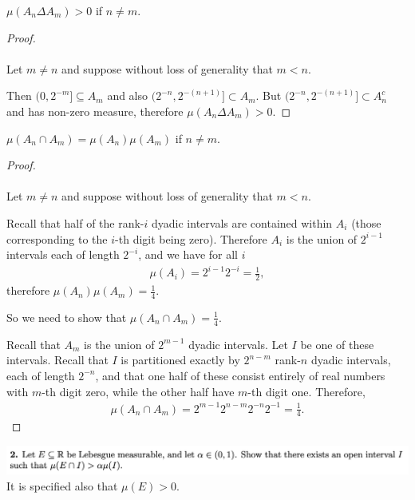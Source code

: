 \begin{claim*}
  $\mu(A_n \Delta A_m) > 0$ if $n \neq m$.
\end{claim*}

\begin{proof}~\\~\\
  Let $m \neq n$ and suppose without loss of generality that $m < n$.

  Then $(0, 2^{-m}] \subseteq A_m$ and also $(2^{-n}, 2^{-(n+1)}] \subset A_m$.
  But $(2^{-n}, 2^{-(n+1)}] \subset A_n^c$ and has non-zero measure, therefore $\mu(A_n \Delta A_m) > 0$.
\end{proof}

\begin{claim*}
  $\mu(A_n \cap A_m) = \mu(A_n)\mu(A_m)$ if $n \neq m$.
\end{claim*}

\begin{proof}~\\~\\
  Let $m \neq n$ and suppose without loss of generality that $m < n$.

  Recall that half of the rank-$i$ dyadic intervals are contained within $A_i$ (those corresponding to
  the $i$-th digit being zero). Therefore $A_i$ is the union of $2^{i-1}$ intervals each of length $2^{-i}$,
  and we have for all $i$
  \begin{align*}
     \mu(A_i) = 2^{i-1}2^{-i} =\frac{1}{2},
  \end{align*}
  therefore $\mu(A_n)\mu(A_m) = \frac{1}{4}$.

  So we need to show that $\mu(A_n \cap A_m) = \frac{1}{4}$.

  Recall that $A_m$ is the union of $2^{m-1}$ dyadic intervals. Let $I$ be one of these intervals. Recall
  that $I$ is partitioned exactly by $2^{n-m}$ rank-$n$ dyadic intervals, each of length $2^{-n}$, and that one
  half of these consist entirely of real numbers with $m$-th digit zero, while the other half have $m$-th digit
  one. Therefore,
  \begin{align*}
    \mu(A_n \cap A_m) = 2^{m-1}2^{n-m}2^{-n}2^{-1} = \frac{1}{4}.
  \end{align*}
\end{proof}
\newpage
\begin{mdframed}
\includegraphics[width=400pt]{img/analysis--berkeley-202a-hw05-2e34.png}\\
It is specified also that $\mu(E) > 0$.
\end{mdframed}


